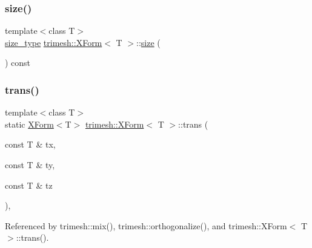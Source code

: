 \subsubsection{\texorpdfstring{size()}{size()}}
{\footnotesize\ttfamily template$<$class T$>$ \\
\hyperlink{classtrimesh_1_1XForm_aa219f141417c9026a74dec8b6279d4bf}{size\+\_\+type} \hyperlink{classtrimesh_1_1XForm}{trimesh\+::\+X\+Form}$<$ T $>$\+::\hyperlink{namespacetrimesh_a1c71e2912be63f694df9e9991bddb15e}{size} (\begin{DoxyParamCaption}{ }\end{DoxyParamCaption}) const\hspace{0.3cm}{\ttfamily [inline]}}

\mbox{\label{classtrimesh_1_1XForm_a7806925df0b74af227489baf4fc4427f}} 
\subsubsection{\texorpdfstring{trans()}{trans()}\hspace{0.1cm}{\footnotesize\ttfamily [1/2]}}
{\footnotesize\ttfamily template$<$class T$>$ \\
static \hyperlink{classtrimesh_1_1XForm}{X\+Form}$<$T$>$ \hyperlink{classtrimesh_1_1XForm}{trimesh\+::\+X\+Form}$<$ T $>$\+::trans (\begin{DoxyParamCaption}\item[{const T \&}]{tx,  }\item[{const T \&}]{ty,  }\item[{const T \&}]{tz }\end{DoxyParamCaption})\hspace{0.3cm}{\ttfamily [inline]}, {\ttfamily [static]}}



Referenced by trimesh\+::mix(), trimesh\+::orthogonalize(), and trimesh\+::\+X\+Form$<$ T $>$\+::trans().

\mbox{\label{classtrimesh_1_1XForm_af3e8fe8bed27a77abf4f1587631ae8e5}} 
